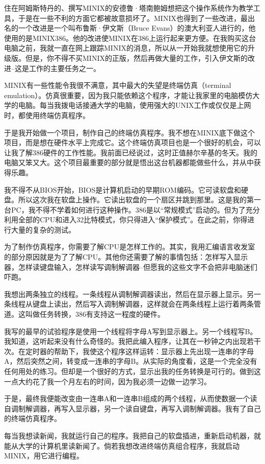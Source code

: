住在阿姆斯特丹的、撰写MINIX的安德鲁·塔南鲍姆想把这个操作系统作为教学工具，于是在一些不利的方面它都被故意损坏了。MINIX也得到了一些改进，最出名的一个改进是一个叫布鲁斯·伊文斯（Bruce Evans）的澳大利亚人进行的，他使用的是MINIX386。他的改进使MINIX在386上运行起来更方便。在我购买这台电脑之前，我就一直在网上跟踪MINIX的消息，所以从一开始我就想使用它的升级版。但是，你不得不买MINIX的正版，然后再做大量的工作，引入伊文斯的改进--这是工作的主要任务之一。

MINIX有一些性能令我很不满意，其中最大的失望是终端仿真（terminal emulation）。仿真很重要，因为我只能依赖这个程序，才能让我家里的电脑模仿大学的电脑。每当我拨电话接通大学的电脑，使用强大的UNIX工作或仅仅是上网时，都使用终端仿真程序。

于是我开始做一个项目，制作自己的终端仿真程序。我不想在MINIX底下做这个项目，而是想在硬件水平上完成它。这个终端仿真项目也是一个很好的机会，可以让我了解386硬件的工作性能。我前面已经说过，这时正值赫尔辛基的冬天。我的电脑又笨又大。这个项目最重要的部分就是悟出这台机器都能做些什么，并从中获得乐趣。

我不得不从BIOS开始，BIOS是计算机启动的早期ROM编码。它可读软盘和硬盘。所以这次我在软盘上操作。它读出软盘的一个扇区并跳到那里。这是我的第一台PC，我不得不学着如何进行这种操作。386是以“常规模式”启动的。但为了充分利用全部的CPU和进入32比特模式，你只得进入“保护模式”。在此之前，你得进行大量的复杂的测试。

为了制作仿真程序，你需要了解CPU是怎样工作的。其实，我用汇编语言收发室的部分原因就是为了了解CPU。其他你还需要了解的事情包括：怎样写入显示器，怎样读键盘输入，怎样读写调制解调器--但愿我的这些文字不会把非电脑迷们吓跑。

我想出两条独立的线程。一条线程从调制解调器读出，然后在显示器上显示。另一条线程从键盘上读出，然后写入调制解调器，这样就会在两条线程上运行着两条管道。这叫做任务转换，386有支持这一程度的硬件。

我写的最早的试验程序是使用一个线程将字母A写到显示器上。另一个线程写B。我知道，这听起来没有什么奇怪的。我把此编入程序，让其在一秒钟之内出现若干次。在定时器的帮助下，我使这个程序这样运转：显示器上先出现一连串的字母A，然后突然之间，转变成一连串的字母B。从实际的角度看，这是一个完全没有任何用处的练习。但却是一个很好的方式，显示出我的任务转换是可行的。做到这一点大约花了我一个月左右的时间，因为我必须一边做一边学习。

于是，最终我便能改变由一连串A和一连串B组成的两个线程，从而使数据一个读自调制解调器，再写入显示器，另一个读自键盘，再写入调制解调器。我有了自己的终端仿真程序。

每当我想读新闻，我就运行自己的程序。我把自己的软盘插进，重新启动机器，就能从大学的计算机里读新闻了。倘若我想改进终端仿真组合程序，我就启动MINIX，用它进行编程。


